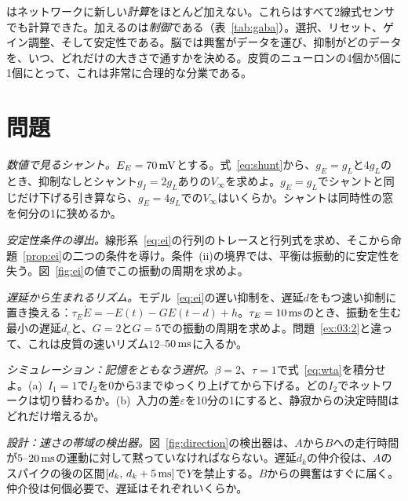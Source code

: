 はネットワークに新しい\emph{計算}をほとんど加えない。これらはすべて2線式センサでも計算できた。加えるのは\emph{制御}である（表~\ref{tab:gaba}）。選択、リセット、ゲイン調整、そして安定性である。脳では興奮がデータを運び、抑制がどのデータを、いつ、どれだけの大きさで通すかを決める。皮質のニューロンの4個か5個に1個にとって、これは非常に合理的な分業である。

\section{問題}

\begin{exercise}[\lvlA]
\label{ex:03:1}
\emph{数値で見るシャント。}$E_E=70\,\text{mV}$とする。式~\eqref{eq:shunt}から、$g_E=g_L$と$4g_L$のとき、抑制なしとシャント$g_I=2g_L$ありの$V_\infty$を求めよ。$g_E=g_L$でシャントと同じだけ下げる引き算なら、$g_E=4g_L$での$V_\infty$はいくらか。シャントは同時性の窓を何分の1に狭めるか。
\end{exercise}

\begin{exercise}[\lvlB]
\label{ex:03:2}
\emph{安定性条件の導出。}線形系~\eqref{eq:ei}の行列のトレースと行列式を求め、そこから命題~\ref{prop:ei}の二つの条件を導け。条件~(ii)の境界では、平衡は振動的に安定性を失う。図~\ref{fig:ei}の値でこの振動の周期を求めよ。
\end{exercise}

\begin{exercise}[\lvlB]
\label{ex:03:3}
\emph{遅延から生まれるリズム。}モデル~\eqref{eq:ei}の遅い抑制を、遅延$d$をもつ速い抑制に置き換える：$\tau_E\dot E=-E(t)-GE(t-d)+h$。$\tau_E=10\,\text{ms}$のとき、振動を生む最小の遅延$d_c$と、$G=2$と$G=5$での振動の周期を求めよ。問題~\ref{ex:03:2}と違って、これは皮質の速いリズム$12$--$50\,\text{ms}$に入るか。
\end{exercise}

\begin{exercise}[\lvlB]
\label{ex:03:4}
\emph{シミュレーション：記憶をともなう選択。}$\beta=2$、$\tau=1$で式~\eqref{eq:wta}を積分せよ。(a)~$I_1=1$で$I_2$を$0$から$3$までゆっくり上げてから下げる。どの$I_2$でネットワークは切り替わるか。(b)~入力の差$\varepsilon$を10分の1にすると、静寂からの決定時間はどれだけ増えるか。
\end{exercise}

\begin{exercise}[\lvlB]
\label{ex:03:5}
\emph{設計：速さの帯域の検出器。}図~\ref{fig:direction}の検出器は、$A$から$B$への走行時間が$5$--$20\,\text{ms}$の運動に対して黙っていなければならない。遅延$d_k$の仲介役は、$A$のスパイクの後の区間$[d_k,\,d_k+5\,\text{ms}]$で$Y$を禁止する。$B$からの興奮はすぐに届く。仲介役は何個必要で、遅延はそれぞれいくらか。
\end{exercise}


